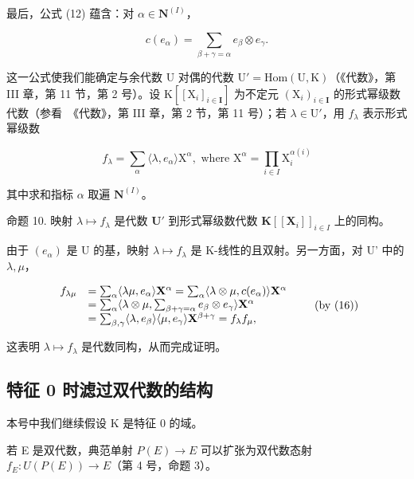 最后，公式 (12) 蕴含：对 \(\alpha \in \mathbf{N}^{(I)}\)，

\[
c (e _ {\alpha}) = \sum_ {\beta + \gamma = \alpha} e _ {\beta} \otimes e _ {\gamma}.\tag{16}
\]

这一公式使我们能确定与余代数 U 对偶的代数 \(\mathrm{U}' = \mathrm{Hom}(\mathrm{U},\mathrm{K})\)（《代数》，第 III 章，第 11 节，第 2 号）。设 \(\mathrm{K}[[\mathrm{X}_i]_{i\in \mathbf{I}}]\) 为不定元 \((\mathrm{X}_i)_{i\in \mathbf{I}}\) 的形式幂级数代数（参看~《代数》，第 III 章，第 2 节，第 11 号）；若 \(\lambda \in \mathrm{U}'\)，用 \(f_{\lambda}\) 表示形式幂级数

\[
f _ {\lambda} = \sum_ {\alpha} \langle \lambda , e _ {\alpha} \rangle \mathrm{X} ^ {\alpha}, \text { where } \mathrm{X} ^ {\alpha} = \prod_ {i \in I} \mathrm{X} _ {i} ^ {\alpha (i)}
\]

其中求和指标 \(\alpha\) 取遍 \(\mathbf{N}^{(I)}\)。

命题 10. 映射 \(\lambda \mapsto f_{\lambda}\) 是代数 \(\mathbf{U}'\) 到形式幂级数代数 \(\mathbf{K}[[\mathbf{X}_i]]_{i \in I}\) 上的同构。

由于 \((e_{\alpha})\) 是 U 的基，映射 \(\lambda \mapsto f_{\lambda}\) 是 K-线性的且双射。另一方面，对 U' 中的 \(\lambda, \mu\)，

\[
\begin{array}{r l} f _ {\lambda \mu} & = \sum_ {\alpha} \langle \lambda \mu , e _ {\alpha} \rangle \mathbf {X} ^ {\alpha} = \sum_ {\alpha} \langle \lambda \otimes \mu , c (e _ {\alpha}) \rangle \mathbf {X} ^ {\alpha} \\ & = \sum_ {\alpha} \langle \lambda \otimes \mu , \sum_ {\beta + \gamma = \alpha} e _ {\beta} \otimes e _ {\gamma} \rangle \mathbf {X} ^ {\alpha} \\ & = \sum_ {\beta , \gamma} \langle \lambda , e _ {\beta} \rangle \langle \mu , e _ {\gamma} \rangle \mathbf {X} ^ {\beta + \gamma} = f _ {\lambda} f _ {\mu}, \end{array}\tag{by (16)}
\]

这表明 \(\lambda \mapsto f_{\lambda}\) 是代数同构，从而完成证明。

\subsection{特征 0 时滤过双代数的结构}

本号中我们继续假设 K 是特征 0 的域。

若 E 是双代数，典范单射 \(P(E) \rightarrow E\) 可以扩张为双代数态射 \(f_{E}: U(P(E)) \rightarrow E\)（第 4 号，命题 3）。


